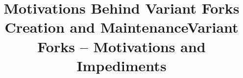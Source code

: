 

\pagestyle{fancy}



\title{Motivations Behind Variant Forks Creation and Maintenance}

\title{Variant Forks -- Motivations and Impediments}



\author{
}


\maketitle

